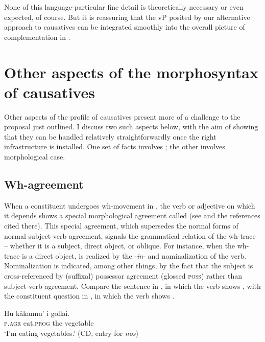 \documentclass[output=paper,
modfonts
]{LSP/langsci}
\begin{document}
\begin{exe}
\begin{xlist}
None of this language-particular fine detail is theoretically necessary
or even expected, of course. But it is reassuring that the vP 
posited by our alternative approach to causatives can be integrated
smoothly into the overall picture of complementation in .

\section{Other aspects of the morphosyntax of causatives}\label{sec:chung:7}

Other aspects of the profile of causatives present more of a challenge
to the proposal just outlined. I discuss two such aspects below, with
the aim of showing that they can be handled relatively straightforwardly
once the right infrastructure is installed. One set of facts involves
; the other involves morphological case.

\subsection{Wh-agreement}

When a constituent undergoes wh-movement in , the verb or
adjective on which it depends shows a special morphological agreement
called  (see \citealt{chung1998} and the references cited there).
This special agreement, which supersedes the normal forms of normal
subject-verb agreement, signals the grammatical relation of the
wh-trace -- whether it is a subject, direct object, or oblique. For
instance, when the wh-trace is a direct object,  is realized
by the  -\emph{in}- and nominalization of the verb. Nominalization
is indicated, among other things, by the fact that the subject is
cross-referenced by (suffixal) possessor agreement (glossed
\textsc{poss}) rather than subject-verb agreement. Compare the sentence
in , in which the verb shows , with the
constituent question in , in which the verb shows .

\ea \label{ex:chung:30}
\ea \label{ex:chung:30a}
\gll  Hu kåkannu' i gollai.\\
\textsc{p.agr} eat\textsc{.prog} the vegetable\\
\glt `I'm eating vegetables.' (CD, entry for \emph{nos})


\end{xlist}
\end{exe}
\end{document}
